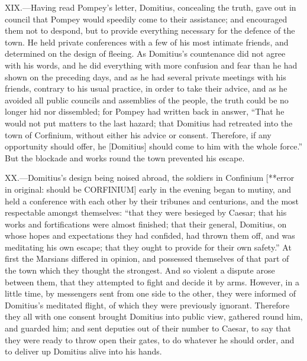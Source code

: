XIX.—Having read Pompey's letter, Domitius, concealing the truth, gave
out in council that Pompey would speedily come to their assistance; and
encouraged them not to despond, but to provide everything necessary for
the defence of the town. He held private conferences with a few of his
most intimate friends, and determined on the design of fleeing. As
Domitius's countenance did not agree with his words, and he did
everything with more confusion and fear than he had shown on the
preceding days, and as he had several private meetings with his friends,
contrary to his usual practice, in order to take their advice, and as he
avoided all public councils and assemblies of the people, the truth
could be no longer hid nor dissembled; for Pompey had written back in
answer, ``That he would not put matters to the last hazard; that Domitius
had retreated into the town of Corfinium, without either his advice or
consent. Therefore, if any opportunity should offer, he [Domitius]
should come to him with the whole force.'' But the blockade and works
round the town prevented his escape.

XX.—Domitius's design being noised abroad, the soldiers in Confinium
[**error in original: should be CORFINIUM] early in the evening began to
mutiny, and held a conference with each other by their tribunes and
centurions, and the most respectable amongst themselves: ``that they were
besieged by Caesar; that his works and fortifications were almost
finished; that their general, Domitius, on whose hopes and expectations
they had confided, had thrown them off, and was meditating his own
escape; that they ought to provide for their own safety.'' At first the
Marsians differed in opinion, and possessed themselves of that part of
the town which they thought the strongest. And so violent a dispute
arose between them, that they attempted to fight and decide it by arms.
However, in a little time, by messengers sent from one side to the
other, they were informed of Domitius's meditated flight, of which they
were previously ignorant. Therefore they all with one consent brought
Domitius into public view, gathered round him, and guarded him; and sent
deputies out of their number to Caesar, to say that they were ready to
throw open their gates, to do whatever he should order, and to deliver
up Domitius alive into his hands.

